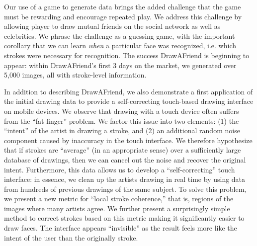 Our use of a game to generate data brings the added challenge that
the game must be rewarding and encourage repeated play. We address
this challenge by allowing player to draw mutual friends on the
social network as well as celebrities. We phrase the challenge as a
guessing game, with the important corollary that we can learn
\emph{when} a particular face was recognized, i.e. which strokes
were necessary for recognition. The success DrawAFriend is beginning
to appear: within DrawAFriend's first 3 days on the market,
we generated over 5,000 images, all with stroke-level information.

In addition to describing DrawAFriend, we also demonstrate a first
application of the initial drawing data to provide a self-correcting
touch-based drawing interface on mobile devices. We observe that
drawing with a touch device often suffers from the ``fat finger''
problem. We factor this issue into two elements: (1) the ``intent''
of the artist in drawing a stroke, and (2) an additional random
noise component caused by inaccuracy in the touch interface. We
therefore hypothesize that if strokes are ``average'' (in an
appropriate sense) over a sufficiently large database of drawings,
then we can cancel out the noise and recover the original intent.
Furthermore, this data allows us to develop a ``self-correcting''
touch interface: in essence, we clean up the artists drawing in real
time by using data from hundreds of previous drawings of the same
subject. To solve this problem, we present a new metric for ``local
stroke coherence,'' that is, regions of the images where many
artists agree. We further present a surprisingly simple method to
correct strokes based on this metric making it significantly easier
to draw faces. The interface appears ``invisible'' as the result
feels more like the intent of the user than the originally stroke.



